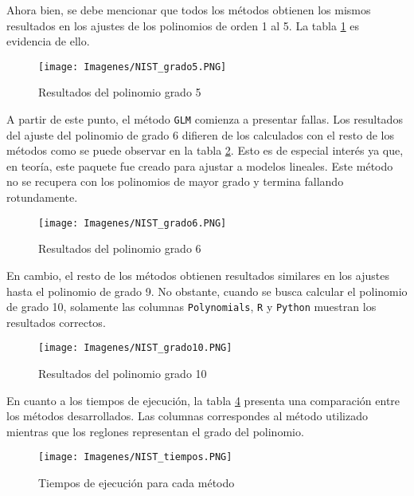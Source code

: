 Ahora bien, se debe mencionar que todos los métodos obtienen los mismos resultados en los ajustes de los polinomios de orden 1 al 5. La tabla \ref{NIST_res_gr5} es evidencia de ello. 

\begin{figure}[h]
	\begin{center}
		\texttt{[image: Imagenes/NIST\_grado5.PNG]}
		\caption{Resultados del polinomio grado 5}
		\label{NIST_res_gr5}
	\end{center}
\end{figure}

A partir de este punto, el método \texttt{GLM} comienza a presentar fallas. Los resultados del ajuste del polinomio de grado 6 difieren de los calculados con el resto de los métodos como se puede observar en la tabla \ref{NIST_res_gr6}. Esto es de especial interés ya que, en teoría, este paquete fue creado para ajustar a modelos lineales. Este método no se recupera con los polinomios de mayor grado y termina fallando rotundamente.


\begin{figure}[h]
\begin{center}
\texttt{[image: Imagenes/NIST\_grado6.PNG]}
\caption{Resultados del polinomio grado 6}
\label{NIST_res_gr6}
\end{center}
\end{figure}

En cambio, el resto de los métodos obtienen resultados similares en los ajustes hasta el polinomio de grado 9. No obstante, cuando se busca calcular el polinomio de grado 10, solamente las columnas \texttt{Polynomials}, \texttt{R} y \texttt{Python} muestran los resultados correctos. 


\begin{figure}[h]
\begin{center}
\texttt{[image: Imagenes/NIST\_grado10.PNG]}
\caption{Resultados del polinomio grado 10}
\label{NIST_res_gr10}
\end{center}
\end{figure}

En cuanto a los tiempos de ejecución, la tabla \ref{NIST_tiempos} presenta una comparación entre los métodos desarrollados. Las columnas correspondes al método utilizado mientras que los reglones representan el grado del polinomio. 


\begin{figure}[h]
\begin{center}
\texttt{[image: Imagenes/NIST\_tiempos.PNG]}
\caption{Tiempos de ejecución para cada método}
\label{NIST_tiempos}
\end{center}
\end{figure}

